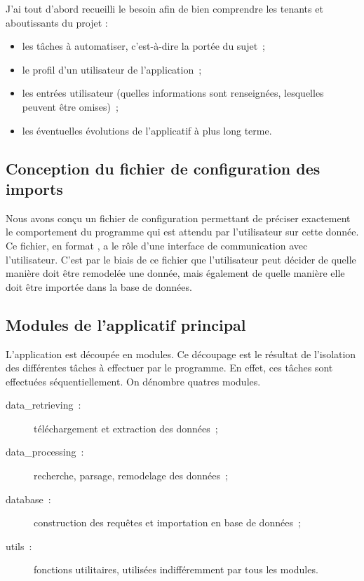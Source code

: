 J'ai tout d'abord recueilli le besoin afin de bien comprendre les tenants et aboutissants du projet :

\begin{itemize}
\item les tâches à automatiser, c'est-à-dire la portée du sujet~;
\item le profil d'un utilisateur de l'application~;
\item les entrées utilisateur (quelles informations sont renseignées, lesquelles peuvent être omises)~;
\item les éventuelles évolutions de l'applicatif à plus long terme.
\end{itemize}

  \subsection*{Conception du fichier de configuration des imports}

Nous avons conçu un fichier de configuration permettant de préciser exactement le comportement du programme qui est attendu par l'utilisateur sur cette donnée. Ce fichier, en format , a le rôle d'une interface de communication avec l'utilisateur. C'est par le biais de ce fichier que l'utilisateur peut décider de quelle manière doit être remodelée une donnée, mais également de quelle manière elle doit être importée dans la base de données.

  \subsection*{Modules de l'applicatif principal}

L'application est découpée en modules. Ce découpage est le résultat de l'isolation des différentes tâches à effectuer par le programme. En effet, ces tâches sont effectuées séquentiellement. On dénombre quatres modules.

\begin{description}
\item[data\_retrieving~:] téléchargement et extraction des données~;
\item[data\_processing~:] recherche, parsage, remodelage des données~;
\item[database~:] construction des requêtes et importation en base de données~;
\item[utils~:] fonctions utilitaires, utilisées indifféremment par tous les modules.
\end{description}

